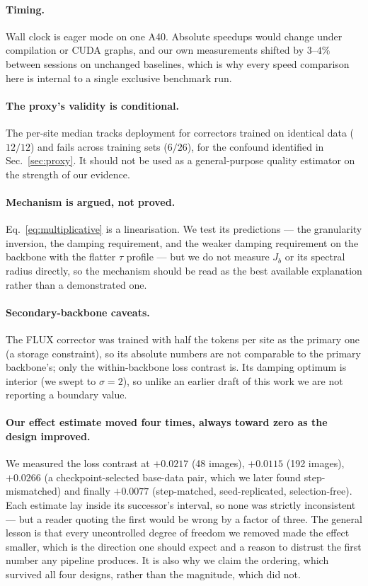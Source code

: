 \paragraph{Timing.} Wall clock is eager mode on one A40. Absolute speedups would
change under compilation or CUDA graphs, and our own measurements shifted by
$3$--$4\%$ between sessions on unchanged baselines, which is why every speed
comparison here is internal to a single exclusive benchmark run.

\paragraph{The proxy's validity is conditional.} The per-site median tracks
deployment for correctors trained on identical data ($12/12$) and fails across
training sets ($6/26$), for the confound identified in Sec.~\ref{sec:proxy}. It
should not be used as a general-purpose quality estimator on the strength of our
evidence.

\paragraph{Mechanism is argued, not proved.} Eq.~\ref{eq:multiplicative} is a
linearisation. We test its predictions --- the granularity inversion, the damping
requirement, and the weaker damping requirement on the backbone with the flatter
$\tau$ profile --- but we do not measure $J_b$ or its spectral radius directly, so the
mechanism should be read as the best available explanation rather than a
demonstrated one.

\paragraph{Secondary-backbone caveats.} The FLUX corrector was trained with half the
tokens per site as the primary one (a storage constraint), so its absolute numbers
are not comparable to the primary backbone's; only the within-backbone loss contrast
is. Its damping optimum is interior (we swept to $\sigma{=}2$), so unlike an earlier
draft of this work we are not reporting a boundary value.

\paragraph{Our effect estimate moved four times, always toward zero as the design
improved.} We measured the loss contrast at $+0.0217$ (48 images), $+0.0115$
(192 images), $+0.0266$ (a checkpoint-selected base-data pair, which we later found
step-mismatched) and finally $+0.0077$ (step-matched, seed-replicated,
selection-free). Each estimate lay inside its successor's interval, so none was
strictly inconsistent --- but a reader quoting the first would be wrong by a factor of
three. The general lesson is that every uncontrolled degree of freedom we removed made
the effect smaller, which is the direction one should expect and a reason to distrust
the first number any pipeline produces. It is also why we claim the ordering, which
survived all four designs, rather than the magnitude, which did not.

